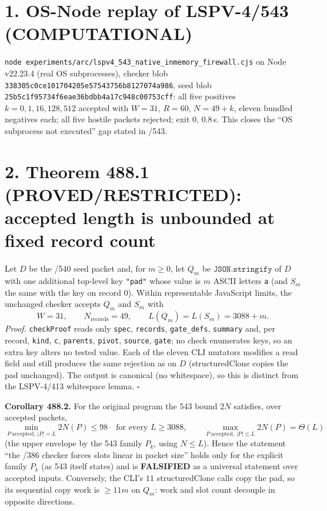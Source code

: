 \documentclass[11pt]{article}
\begin{document}
\section*{1. OS-Node replay of LSPV-4/543 (COMPUTATIONAL)}
\texttt{node experiments/arc/lspv4\_543\_native\_inmemory\_firewall.cjs} on Node v22.23.4 (real OS subprocesses), checker blob \texttt{338305c0ce101704205e57543756b8127074a986}, seed blob \texttt{25b5c1f95734f6eae36bdbb4a17c948c00753cff}: all five positives $k=0,1,16,128,512$ accepted with $W=31$, $R=60$, $N=49+k$, eleven bundled negatives each; all five hostile packets rejected; exit 0, 0.8\,s. This closes the ``OS subprocess not executed'' gap stated in /543.

\section*{2. Theorem 488.1 (PROVED/RESTRICTED): accepted length is unbounded at fixed record count}
Let $D$ be the /540 seed packet and, for $m\ge0$, let $Q_m$ be $\mathtt{JSON.stringify}$ of $D$ with one additional top-level key \texttt{"pad"} whose value is $m$ ASCII letters \texttt{a} (and $S_m$ the same with the key on record 0). Within representable JavaScript limits, the unchanged checker accepts $Q_m$ and $S_m$ with
\[
W=31,\qquad N_{\mathrm{records}}=49,\qquad L(Q_m)=L(S_m)=3088+m .
\]
\emph{Proof.} \texttt{checkProof} reads only \texttt{spec}, \texttt{records}, \texttt{gate\_defs}, \texttt{summary} and, per record, \texttt{kind}, \texttt{c}, \texttt{parents}, \texttt{pivot}, \texttt{source}, \texttt{gate}; no check enumerates keys, so an extra key alters no tested value. Each of the eleven CLI mutators modifies a read field and still produces the same rejection as on $D$ (structuredClone copies the pad unchanged). The output is canonical (no whitespace), so this is distinct from the LSPV-4/413 whitespace lemma. $\square$

\textbf{Corollary 488.2.} For the original program the 543 bound $2N$ satisfies, over accepted packets,
\[
\min_{P\ \mathrm{accepted},\,|P|=L}2N(P)\le 98\quad\text{for every }L\ge3088,
\qquad
\max_{P\ \mathrm{accepted},\,|P|\le L}2N(P)=\Theta(L)
\]
(the upper envelope by the 543 family $P_k$, using $N\le L$). Hence the statement ``the /386 checker forces slots linear in packet size'' holds only for the explicit family $P_k$ (as 543 itself states) and is \textbf{FALSIFIED} as a universal statement over accepted inputs. Conversely, the CLI's $11$ structuredClone calls copy the pad, so its sequential copy work is $\ge 11m$ on $Q_m$: work and slot count decouple in opposite directions.
\end{document}
